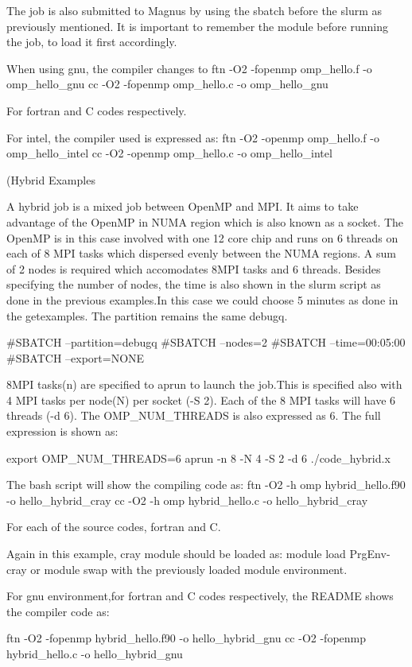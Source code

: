 \begin{Document}
{The job is also submitted to Magnus by using the sbatch before the slurm as previously mentioned.
It is important to remember the module before running the job, to load it first accordingly.

When using gnu, the compiler changes to 
ftn -O2 -fopenmp omp_hello.f -o omp_hello_gnu
cc -O2 -fopenmp omp_hello.c -o omp_hello_gnu
 
For fortran and C codes respectively.

For intel, the compiler used is expressed as:
ftn -O2 -openmp omp_hello.f -o omp_hello_intel
cc -O2 -openmp omp_hello.c -o omp_hello_intel

\Subsubsection(Hybrid Examples}

A hybrid job is a mixed job between OpenMP and MPI. It aims to take advantage of the OpenMP in NUMA region which is also known as a socket.
The OpenMP is in this case involved with one 12 core chip and runs on 6 threads on each of 8 MPI tasks which dispersed evenly between the NUMA regions.
A sum of 2 nodes is required which accomodates 8MPI tasks and 6 threads.
Besides specifying the number of nodes, the time is also shown in the slurm script as done in the previous examples.In this case we could choose 5 minutes as done in the getexamples.
The partition remains the same debugq.

#SBATCH --partition=debugq
#SBATCH --nodes=2
#SBATCH --time=00:05:00
#SBATCH --export=NONE

8MPI tasks(n) are specified to aprun to launch the job.This is specified also with 4 MPI tasks per node(N) per socket (-S 2).
Each of the 8 MPI tasks will have 6 threads (-d 6). The OMP_NUM_THREADS is also expressed as 6.
The full expression is shown as:

export OMP_NUM_THREADS=6
aprun -n 8 -N 4 -S 2 -d 6 ./code_hybrid.x

The bash script will show the compiling code as:
ftn -O2 -h omp hybrid_hello.f90 -o hello_hybrid_cray
cc -O2 -h omp hybrid_hello.c -o hello_hybrid_cray

For each of the source codes, fortran and C.

Again in this example, cray module should be loaded as:
module load PrgEnv-cray or module swap with the previously loaded module environment.

For gnu environment,for fortran and C codes respectively, the README shows the compiler code as:

ftn -O2 -fopenmp hybrid_hello.f90 -o hello_hybrid_gnu
cc -O2 -fopenmp hybrid_hello.c -o hello_hybrid_gnu


\end{Document}
